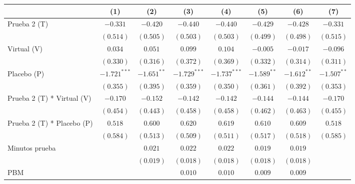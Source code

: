 
\begin{table}
\begin{center}
\begin{tabular}{l c c c c c c c}
\hline
 & (1) & (2) & (3) & (4) & (5) & (6) & (7) \\
\hline
Prueba 2 (T)                   & $-0.331$       & $-0.420$      & $-0.440$       & $-0.440$       & $-0.429$      & $-0.428$      & $-0.331$      \\
                               & $(0.514)$      & $(0.505)$     & $(0.503)$      & $(0.503)$      & $(0.499)$     & $(0.498)$     & $(0.515)$     \\
Virtual (V)                    & $0.034$        & $0.051$       & $0.099$        & $0.104$        & $-0.005$      & $-0.017$      & $-0.096$      \\
                               & $(0.330)$      & $(0.316)$     & $(0.372)$      & $(0.369)$      & $(0.332)$     & $(0.314)$     & $(0.311)$     \\
Placebo (P)                    & $-1.721^{***}$ & $-1.651^{**}$ & $-1.729^{***}$ & $-1.737^{***}$ & $-1.589^{**}$ & $-1.612^{**}$ & $-1.507^{**}$ \\
                               & $(0.355)$      & $(0.395)$     & $(0.359)$      & $(0.350)$      & $(0.361)$     & $(0.392)$     & $(0.353)$     \\
Prueba 2 (T) * Virtual (V)     & $-0.170$       & $-0.152$      & $-0.142$       & $-0.142$       & $-0.144$      & $-0.144$      & $-0.170$      \\
                               & $(0.454)$      & $(0.443)$     & $(0.458)$      & $(0.458)$      & $(0.462)$     & $(0.463)$     & $(0.455)$     \\
Prueba 2 (T) * Placebo (P)     & $0.518$        & $0.600$       & $0.620$        & $0.619$        & $0.610$       & $0.609$       & $0.518$       \\
                               & $(0.584)$      & $(0.513)$     & $(0.509)$      & $(0.511)$      & $(0.517)$     & $(0.518)$     & $(0.585)$     \\
Minutos prueba                 &                & $0.021$       & $0.022$        & $0.022$        & $0.019$       & $0.019$       &               \\
                               &                & $(0.019)$     & $(0.018)$      & $(0.018)$      & $(0.018)$     & $(0.018)$     &               \\
PBM                            &                &               & $0.010$        & $0.010$        & $0.009$       & $0.009$       &               \\

\end{tabular}
\end{center}
\end{table}
